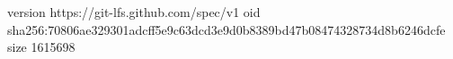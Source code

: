 version https://git-lfs.github.com/spec/v1
oid sha256:70806ae329301adcff5e9c63dcd3e9d0b8389bd47b08474328734d8b6246dcfe
size 1615698
